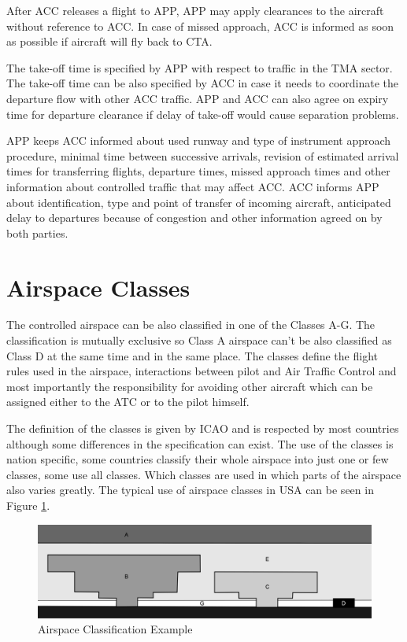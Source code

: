 After ACC releases a flight to APP, APP may apply clearances to the aircraft without reference to ACC. In case of missed approach, ACC is informed as soon as possible if aircraft will fly back to CTA.

The take-off time is specified by APP with respect to traffic in the TMA sector. The take-off time can be also specified by ACC in case it needs to coordinate the departure flow with other ACC traffic. APP and ACC can also agree on expiry time for departure clearance if delay of take-off would cause separation problems.

APP keeps ACC informed about used runway and type of instrument approach procedure, minimal time between successive arrivals, revision of estimated arrival times for transferring flights, departure times, missed approach times and other information about controlled traffic that may affect ACC. ACC informs APP about identification, type and point of transfer of incoming aircraft, anticipated delay to departures because of congestion and other information agreed on by both parties.\cite[Chapter 10]{doc4444}

\section{Airspace Classes}

The controlled airspace can be also classified in one of the Classes A-G. The classification is mutually exclusive so Class A airspace can't be also classified as Class D at the same time and in the same place. The classes define the flight rules used in the airspace, interactions between pilot and Air Traffic Control and most importantly the responsibility for avoiding other aircraft which can be assigned either to the ATC or to the pilot himself. \cite{annex11}

The definition of the classes is given by ICAO and is respected by most countries although some differences in the specification can exist. The use of the classes is nation specific, some countries classify their whole airspace into just one or few classes, some use all classes. Which classes are used in which parts of the airspace also varies greatly. \cite{classes} The typical use of airspace classes in USA can be seen in Figure \ref{fig:classes}.

\begin{figure}[h]
    \centering
    \includegraphics[width=\textwidth]{figures/classes.png}
    \caption{Airspace Classification Example \cite{nolan}}
    \label{fig:classes}
\end{figure}

